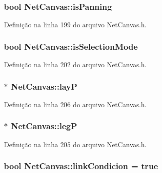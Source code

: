 \subsubsection[{is\+Panning}]{\setlength{\rightskip}{0pt plus 5cm}bool Net\+Canvas\+::is\+Panning}\label{class_net_canvas_a15555c4f1765cf31e0380217eb32a18d}


Definição na linha 199 do arquivo Net\+Canvas.\+h.

\subsubsection[{is\+Selection\+Mode}]{\setlength{\rightskip}{0pt plus 5cm}bool Net\+Canvas\+::is\+Selection\+Mode}\label{class_net_canvas_a7b6f23aaf47cab40855f8a082fe4fde9}


Definição na linha 202 do arquivo Net\+Canvas.\+h.

\subsubsection[{layP}]{$\ast$ Net\+Canvas\+::layP}\label{class_net_canvas_ad53e17da8852e40c395eba6e36a68fcb}


Definição na linha 206 do arquivo Net\+Canvas.\+h.

\subsubsection[{legP}]{$\ast$ Net\+Canvas\+::legP}\label{class_net_canvas_a2253fb989bac6cd201fe731c49c19c62}


Definição na linha 205 do arquivo Net\+Canvas.\+h.

\subsubsection[{link\+Condicion}]{\setlength{\rightskip}{0pt plus 5cm}bool Net\+Canvas\+::link\+Condicion = true}\label{class_net_canvas_a7c1bfba43faf77d6ca52e3c0b3516956}


